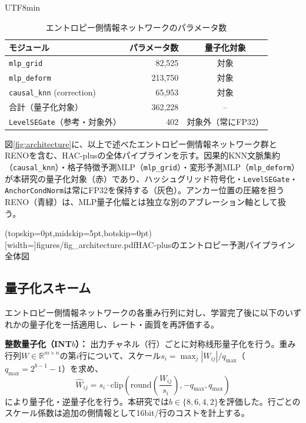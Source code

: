 \documentclass{ieeeaccess}
\begin{document}
\begin{CJK}{UTF8}{min}
\begin{table}[!t]
\renewcommand{\arraystretch}{1.2}
\caption{エントロピー側情報ネットワークのパラメータ数}
\label{tab:param-count}
\centering
\begin{tabular}{lrc}
\toprule
モジュール & パラメータ数 & 量子化対象 \\
\midrule
\texttt{mlp\_grid} & 82{,}525 & 対象 \\
\texttt{mlp\_deform} & 213{,}750 & 対象 \\
\texttt{causal\_knn} (correction) & 65{,}953 & 対象 \\
\midrule
合計（量子化対象） & 362{,}228 & -- \\
\midrule
\texttt{LevelSEGate}（参考・対象外） & 402 & 対象外（常にFP32） \\
\bottomrule
\end{tabular}
\end{table}

図\ref{fig:architecture}に、以上で述べたエントロピー側情報ネットワーク群とRENOを含む、HAC-plusの全体パイプラインを示す。因果的KNN文脈集約（\texttt{causal\_knn}）・格子特徴予測MLP（\texttt{mlp\_grid}）・変形予測MLP（\texttt{mlp\_deform}）が本研究の量子化対象（赤）であり、ハッシュグリッド符号化・\texttt{LevelSEGate}・\texttt{AnchorCondNorm}は常にFP32を保持する（灰色）。アンカー位置の圧縮を担うRENO（青緑）は、MLP量子化幅とは独立な別のアブレーション軸として扱う。

\Figure[t!](topskip=0pt,midskip=5pt,botskip=0pt)[width=\columnwidth]{figures/fig_architecture.pdf}{HAC-plusのエントロピー予測パイプライン全体図\label{fig:architecture}}

\subsection{量子化スキーム}
エントロピー側情報ネットワークの各重み行列に対し、学習完了後に以下のいずれかの量子化を一括適用し、レート・画質を再評価する。

\textbf{整数量子化（INT$b$）：} 出力チャネル（行）ごとに対称线形量子化を行う。重み行列$W \in \mathbb{R}^{m \times n}$の第$i$行について、スケール$s_i = \max_j |W_{ij}| / q_{\max}$（$q_{\max}=2^{b-1}-1$）を求め、
\begin{equation}
\hat{W}_{ij} = s_i \cdot \mathrm{clip}\left(\mathrm{round}\left(\frac{W_{ij}}{s_i}\right), -q_{\max}, q_{\max}\right)
\end{equation}
により量子化・逆量子化を行う。本研究では$b \in \{8, 6, 4, 2\}$を評価した。行ごとのスケール係数は追加の側情報として16bit/行のコストを計上する。


\end{CJK}
\end{document}
